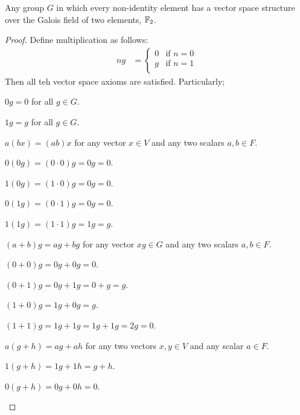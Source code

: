 \begin{claim}
  Any group $G$ in which every non-identity element has
  a vector space structure over the Galois field of two elements,
  $\mathbb{F}_2$.

  \begin{proof}
    Define multiplication as follows:
    \begin{align*}
      n g &= \begin{cases}
        0 & \text{if $n = 0$} \\
        g & \text{if $n = 1$} \\
      \end{cases} 
    \end{align*}
    Then all teh vector space axioms are satisfied. Particularly;
    \begin{enumarabic}
      \item $0g = 0$ for all $g \in G$.
      \item $1g = g$ for all $g \in G$.
      \item $a(bx) = (ab)x$ for any vector $x \in V$ and any two scalars $a, b \in F$.
        \begin{enumroman}
          \item $0(0g) = (0 \cdot 0)g = 0g = 0$.
          \item $1(0g) = (1 \cdot 0)g = 0g = 0$.
          \item $0(1g) = (0 \cdot 1)g = 0g = 0$.
          \item $1(1g) = (1 \cdot 1)g = 1g = g$.
        \end{enumroman}
      \item $(a+b)g = ag + bg$ for any vector $xg \in G$ and any two scalars $a, b \in F$.
        \begin{enumroman}
          \item $(0+0)g = 0g + 0g = 0$.
          \item $(0+1)g = 0g + 1g = 0 + g = g$.
          \item $(1+0)g = 1g + 0g = g$.
          \item $(1+1)g = 1g + 1g = 1g + 1g = 2g = 0$.
        \end{enumroman}
      \item $a(g+h) = ag + ah$ for any two vectors $x, y \in V$ and any scalar $a \in F$.
        \begin{enumroman}
          \item $1(g+h) = 1g + 1h = g + h$.
          \item $0(g+h) = 0g + 0h = 0$.
        \end{enumroman}
    \end{enumarabic}
  \end{proof}
\end{claim}












